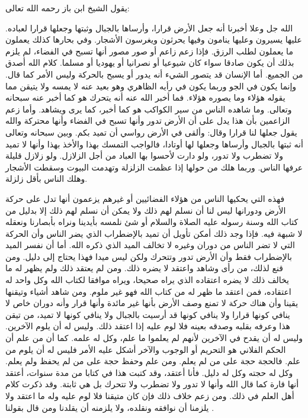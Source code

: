 يقول الشيخ ابن باز رحمه الله تعالى:

الله جل وعلا أخبرنا أنه جعل الأرض قرارا، وأرساها بالجبال وثبتها وجعلها قرارا لعباده. عليها يسيرون وعليها ينامون وفيها يحرثون ويغرسون الأشجار. وفي بحارها كذلك يعملون ما يعملون لطلب الرزق. فإذا زعم زاعم أو صور مصور أنها تسبح في الفضاء، لم يلزم بذلك أن يكون صادقا سواء كان شيوعيا أو نصرانيا أو يهوديا أو مسلما. كلام الله أصدق من الجميع. أما الإنسان قد يتصور الشيء أنه يدور أو يسبح بالحركة وليس الأمر كما قال. وإنما يكون في الجو وربما يكون في رأيه الظاهري وهو بعيد عنه لا يمسه ولا يتيقن مما يقوله هؤلاء وما يصوره هؤلاء. فما أخبر الله عنه أنه يتحرك هو كما أخبر عنه سبحانه وتعالى. وما شاهده الناس من سير الكواكب هو كما أخبر، كما يرى ويشاهد. وأما زعم الزاعمين بأن هذا يدل على أن الأرض تدور وأنها تسبح في الفضاء وأنها محتركة والله يقول جعلها لنا قرارا وقال: وألقى في الأرض رواسي أن تميد بكم. وبين سبحانه وتعالى أنه ثبتها بالجبال وأرساها وجعلها لها أوتادا، فالواجب التمسك بهذا والأخذ بهذا وأنها لا تميد ولا تضطرب ولا تدور، ولو دارت لأحسوا بها العباد من أجل الزلازل. ولو زلازل قليلة عرفها الناس. وربما هلك من حولها إذا عظمت الزلزلة وتهدمت البيوت وسقطت الأشجار وهلك الناس بأقل زلزلة. 

فهذه التي يحكيها الناس من هؤلاء الفضائيين أو غيرهم يزعمون أنها تدل على حركة الأرض ودورانها ليس لنا أن نسلم لهم ذلك ولا يمكن أن نسلم لهم ذلك إلا بدليل من كتاب الله وسنة رسوله عليه الصلاة والسلام أو شئ نلمسه بأيدينا ونراه بأبصارنا ونعقله لا شبهة فيه. فإذا وجد  ذلك أمكن تأويل أن تميد بالإضطراب الذي يضر الناس وأن الحركة التي لا تضر الناس من دوران وغيره لا تخالف الميد الذي ذكره الله. أما أن نفسر الميد بالإضطراب فقط وأن الأرض تدور وتتحرك ولكن ليس ميدا فهذا يحتاج إلى دليل. ومن قنع لذلك، من رأى وشاهد واعتقد لا يضره ذلك. ومن لم يعتقد ذلك ولم يظهر له ما يخالف ذلك لا يضره اعتقاده الذي يراه صحيحا، ويراه موافقا لكتاب الله وكل واحد له اعتقاده، فمن اعتقد ما ظهر له من كتاب الله فهو غير ملوم. ومن شاهد أشياء وتيقنها يقينا وأن هناك حركة لا تمنع وصف الأرض بأنها غير مائدة وأنها قرار وأنه دوران خاص لا ينافي كونها قرارا ولا ينافي كونها قد أرسيت بالجبال ولا ينافي كونها لا تميد، من تيقن هذا وعرفه بقلبه وصدقه بعينه فلا لوم عليه إذا اعتقد ذلك. وليس له أن يلوم الآخرين. وليس له أن يقدح في الآخرين لأنهم لم يعلموا ما علم، وكل له علمه. كما أن من علم أن الحكم الفلاني هو التحريم أو الوجوب والآخر أشكل عليه الأمر فليس له أن يلوم من علم. فالحجة حجة على من لم يعلم. ومن علم وحفظ حجة على من لم يحفظ ولم يعلم. وكل له حجته وكل له دليل. فأنا أعتقد، وقد كتبت هذا في كتابا من مدة سنوات، أعتقد أنها قارة كما قال الله وأنها لا تدور ولا تضطرب ولا تتحرك بل هي ثابتة. وقد ذكرت كلام أهل العلم في ذلك. ومن زعم خلاف ذلك فإن كان متيقنا فلا لوم عليه وله ما اعتقد ولا يلزمنا أن نوافقه ونقلده، ولا يلزمنه أن يقلدنا ومن قال بقولنا \href{https://www.youtube.com/watch?v=nbzh7p2ZlFQ}{\faExternalLink}. 

